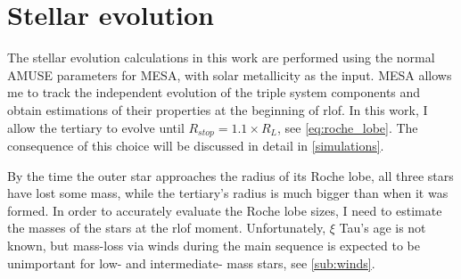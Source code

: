 \section{Stellar evolution}\label{sec:stellar_evolution}

The stellar evolution calculations in this work are performed using the normal AMUSE parameters for MESA, with solar metallicity as the input.
MESA allows me to track the independent evolution of the triple system components and obtain estimations of their properties at the beginning of \ac{rlof}. In this work, I allow the tertiary to evolve until $R_{stop} = 1.1 \times R_{L}$, see \cref{eq:roche_lobe}. The consequence of this choice will be discussed in detail in \cref{simulations}.

By the time the outer star approaches the radius of its Roche lobe, all three stars have lost some mass, while the tertiary's radius is much bigger than when it was formed. In order to accurately evaluate the Roche lobe sizes,  I need to estimate the masses of the stars at the \ac{rlof} moment. Unfortunately, $\xi$ Tau's age is not known, but mass-loss via winds during the main sequence is expected to be unimportant for low- and intermediate- mass stars, see \cref{sub:winds}.

